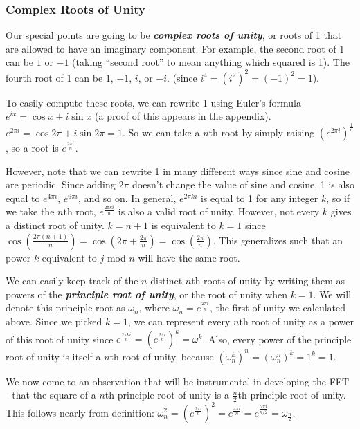 \documentclass[11pt, oneside]{article}
\newcommand{\emphasis}[1]{\textbf{\textit{#1}}}
\theoremstyle{plain}
\theoremstyle{definition}
\begin{document}
\subsubsection{Complex Roots of Unity}
Our special points are going to be \emphasis{complex roots of unity},
or roots of 1 that are allowed to have an imaginary component.
For example, the second root of 1 can be \( 1 \) or \( -1 \)
(taking \enquote{second root} to mean anything which squared is 1).
The fourth root of 1 can be \( 1 \), \( -1 \), \( i \), or \( -i \).
(since \( i^4 = (i^2)^2 = (-1)^2 = 1 \)). 

To easily compute these roots, we can rewrite 1 using Euler's formula
\( e^{ix} = \cos x + i \sin x \) (a proof of this appears in the appendix).
\( e^{2 \pi i} = \cos 2 \pi + i \sin 2 \pi = 1 \).
So we can take a \( n \)th root by simply raising
\( (e^{2 \pi i})^{\frac{1}{n}} \), so a root is \( e^{\frac{2 \pi i}{n}} \).

However, note that we can rewrite 1 in many different ways since sine and cosine
are periodic. Since adding \( 2 \pi \) doesn't change the value of sine and
cosine, 1 is also equal to \( e^{4 \pi i} \), \( e^{6 \pi i} \), and so on. In
general, \( e^{2 \pi k i} \) is equal to 1 for any integer \( k \),
so if we take the \( n \)th root, \( e^{\frac{2 \pi k i}{n}} \) is also 
a valid root of unity. However, not every \( k \) gives a distinct
root of unity. \( k = n + 1 \) is equivalent to \( k = 1 \) since
\( \cos(\frac{2 \pi(n + 1)}{n}) = \cos(2 \pi + \frac{2 \pi}{n}) =
\cos(\frac{2 \pi}{n}) \). This generalizes such that an power \( k \) equivalent
to \( j \) mod \( n \) will have the same root.

We can easily keep track of the \( n \) distinct \( n \)th roots of unity by 
writing them as powers of the \emphasis{principle root of unity},
or the root of unity when \( k = 1 \).
We will denote this principle root as \( \omega_n \), where
\( \omega_n = e^{\frac{2 \pi i}{n}} \), the first of unity we calculated above.
Since we picked \( k = 1 \), we can represent every \( n \)th root of unity as 
a power of this root of unity since 
\( e^{\frac{2 \pi k i}{n}} = (e^{\frac{2 \pi i}{n}})^k = \omega^k \).
Also, every power of the principle root of unity is itself a \( n \)th 
root of unity, because \( (\omega^k_n)^n = (\omega^n_n)^k = 1^k = 1 \). 

We now come to an observation that will be instrumental in developing the FFT -
that the square of a \( n \)th principle root of unity is a \( \frac{n}{2} \)th
principle root of unity. This follows nearly from definition:
\( \omega_n^2 = (e^{\frac{2 \pi i}{n}})^2 = e^{\frac{4 \pi i}{n}}
= e^{\frac{2 \pi i}{n/2}} = \omega_{\frac{n}{2}} \).
\end{document}
